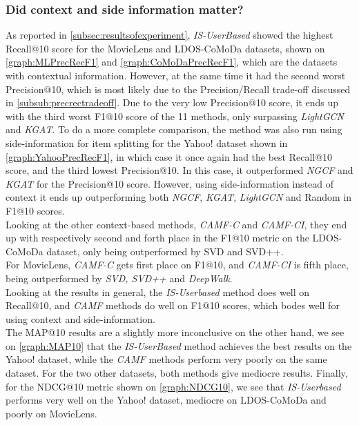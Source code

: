 \subsubsection{Did context and side information matter?}
As reported in \autoref{subsec:resultsofexperiment}, \textit{IS-UserBased} showed the highest Recall@10 score for the MovieLens and LDOS-CoMoDa datasets, shown on \autoref{graph:MLPrecRecF1} and \autoref{graph:CoMoDaPrecRecF1}, which are the datasets with contextual information.
However, at the same time it had the second worst Precision@10, which is most likely due to the Precision/Recall trade-off discussed in \autoref{subsub:precrectradeoff}.
Due to the very low Precision@10 score, it ends up with the third worst F1@10 score of the 11 methods, only surpassing \textit{LightGCN} and \textit{KGAT}.
To do a more complete comparison, the method was also run using side-information for item splitting for the Yahoo! dataset shown in \autoref{graph:YahooPrecRecF1}, in which case it once again had the best Recall@10 score, and the third lowest Precision@10.
In this case, it outperformed \textit{NGCF} and \textit{KGAT} for the Precision@10 score.
However, using side-information instead of context it ends up outperforming both \textit{NGCF}, \textit{KGAT}, \textit{LightGCN} and Random in F1@10 scores.\\
Looking at the other context-based methods, \textit{CAMF-C} and \textit{CAMF-CI}, they end up with respectively second and forth place in the F1@10 metric on the LDOS-CoMoDa dataset, only being outperformed by SVD and SVD++.\\
For MovieLens, \textit{CAMF-C} gets first place on F1@10, and \textit{CAMF-CI} is fifth place, being outperformed by \textit{SVD, SVD++} and \textit{DeepWalk}.\\
Looking at the results in general, the \textit{IS-Userbased} method does well on Recall@10, and \textit{CAMF} methods do well on F1@10 scores, which bodes well for using context and side-information.\\
The MAP@10 results are a slightly more inconclusive on the other hand, we see on \autoref{graph:MAP10} that the \textit{IS-UserBased} method achieves the best results on the Yahoo! dataset, while the \textit{CAMF} methods perform very poorly on the same dataset.
For the two other datasets, both methods give mediocre results.
Finally, for the NDCG@10 metric shown on \autoref{graph:NDCG10}, we see that \textit{IS-Userbased} performs very well on the Yahoo! dataset, mediocre on LDOS-CoMoDa and poorly on MovieLens.
\\\\
